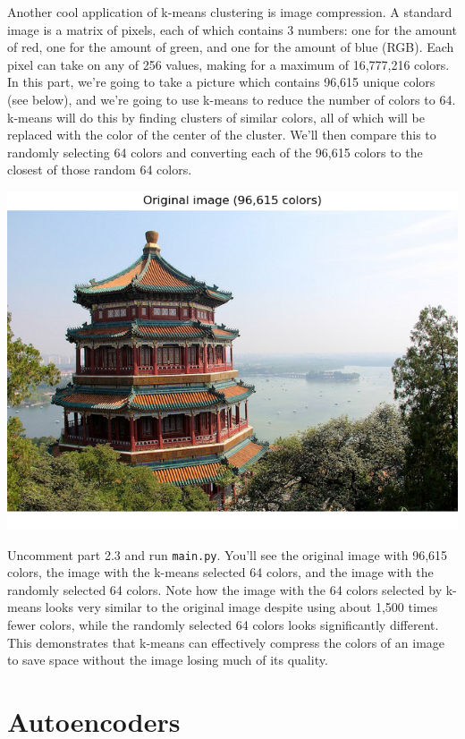 \documentclass{article}
\begin{document}
Another cool application of k-means clustering is image compression. A standard image is a matrix of pixels, each of which contains 3 numbers: one for the amount of red, one for the amount of green, and one for the amount of blue (RGB). Each pixel can take on any of 256 values, making for a maximum of 16,777,216 colors. In this part, we're going to take a picture which contains 96,615 unique colors (see below), and we're going to use k-means to reduce the number of colors to 64. k-means will do this by finding clusters of similar colors, all of which will be replaced with the color of the center of the cluster. We'll then compare this to randomly selecting 64 colors and converting each of the 96,615 colors to the closest of those random 64 colors.

\noindent
\includegraphics[width=\textwidth]{china.png}

Uncomment part 2.3 and run \texttt{main.py}. You'll see the original image with 96,615 colors, the image with the k-means selected 64 colors, and the image with the randomly selected 64 colors. Note how the image with the 64 colors selected by k-means looks very similar to the original image despite using about 1,500 times fewer colors, while the randomly selected 64 colors looks significantly different. This demonstrates that k-means can effectively compress the colors of an image to save space without the image losing much of its quality.

\section{Autoencoders}
\end{document}
